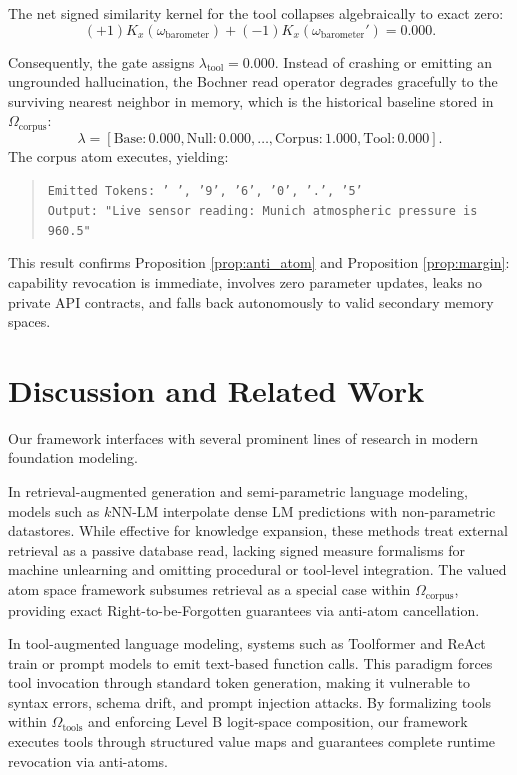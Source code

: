 \documentclass[preprint,12pt]{elsarticle}
\begin{document}
The net signed similarity kernel for the tool collapses algebraically to exact zero:
\begin{equation}
(+1) K_x(\omega_{\mathrm{barometer}}) + (-1) K_x(\omega_{\mathrm{barometer}}') = 0.000.
\end{equation}

Consequently, the gate assigns $\lambda_{\mathrm{tool}} = 0.000$. Instead of crashing or emitting an ungrounded hallucination, the Bochner read operator degrades gracefully to the surviving nearest neighbor in memory, which is the historical baseline stored in $\Omega_{\mathrm{corpus}}$:
\begin{equation}
\lambda = [\text{Base}: 0.000, \text{Null}: 0.000, \dots, \text{Corpus}: 1.000, \text{Tool}: 0.000].
\end{equation}
The corpus atom executes, yielding:
\begin{quote}
\texttt{Emitted Tokens: ' ', '9', '6', '0', '.', '5'} \\
\texttt{Output: "Live sensor reading: Munich atmospheric pressure is 960.5"}
\end{quote}

This result confirms Proposition \ref{prop:anti_atom} and Proposition \ref{prop:margin}: capability revocation is immediate, involves zero parameter updates, leaks no private API contracts, and falls back autonomously to valid secondary memory spaces.

\section{Discussion and Related Work}

Our framework interfaces with several prominent lines of research in modern foundation modeling.

In retrieval-augmented generation and semi-parametric language modeling, models such as $k\text{NN-LM}$ interpolate dense LM predictions with non-parametric datastores. While effective for knowledge expansion, these methods treat external retrieval as a passive database read, lacking signed measure formalisms for machine unlearning and omitting procedural or tool-level integration. The valued atom space framework subsumes retrieval as a special case within $\Omega_{\mathrm{corpus}}$, providing exact Right-to-be-Forgotten guarantees via anti-atom cancellation.

In tool-augmented language modeling, systems such as Toolformer and ReAct train or prompt models to emit text-based function calls. This paradigm forces tool invocation through standard token generation, making it vulnerable to syntax errors, schema drift, and prompt injection attacks. By formalizing tools within $\Omega_{\mathrm{tools}}$ and enforcing Level B logit-space composition, our framework executes tools through structured value maps and guarantees complete runtime revocation via anti-atoms.
\end{document}
